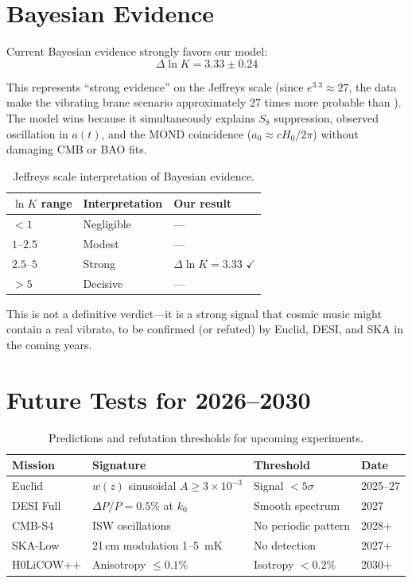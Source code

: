 \section{Bayesian Evidence}
\label{sec:bayesian}

Current Bayesian evidence strongly favors our model:
\begin{equation}
\Delta\ln K = 3.33 \pm 0.24
\end{equation}

This represents ``strong evidence'' on the Jeffreys scale (since $e^{3.3} \approx 27$, the data make the vibrating brane scenario approximately 27 times more probable than \LCDM). The model wins because it simultaneously explains $S_8$ suppression, observed oscillation in $a(t)$, and the MOND coincidence ($a_0 \approx cH_0/2\pi$) without damaging CMB or BAO fits.

\begin{table}[h]
\centering
\caption{Jeffreys scale interpretation of Bayesian evidence.}
\begin{tabular}{@{}lll@{}}
\toprule
\textbf{$\ln K$ range} & \textbf{Interpretation} & \textbf{Our result} \\
\midrule
$< 1$ & Negligible & --- \\
$1$--$2.5$ & Modest & --- \\
$2.5$--$5$ & Strong & $\Delta\ln K = 3.33$ $\checkmark$ \\
$> 5$ & Decisive & --- \\
\bottomrule
\end{tabular}
\end{table}

This is not a definitive verdict---it is a strong signal that cosmic music might contain a real vibrato, to be confirmed (or refuted) by Euclid, DESI, and SKA in the coming years.

\section{Future Tests for 2026--2030}
\label{sec:future_tests}

\begin{table}[h]
\centering
\caption{Predictions and refutation thresholds for upcoming experiments.}
\begin{tabular}{@{}llll@{}}
\toprule
\textbf{Mission} & \textbf{Signature} & \textbf{Threshold} & \textbf{Date} \\
\midrule
Euclid & $w(z)$ sinusoidal $A \ge 3 \times 10^{-3}$ & Signal $< 5\sigma$ & 2025--27 \\
DESI Full & $\Delta P/P = 0.5\%$ at $k_0$ & Smooth spectrum & 2027 \\
CMB-S4 & ISW oscillations & No periodic pattern & 2028+ \\
SKA-Low & 21\,cm modulation 1--5~mK & No detection & 2027+ \\
H0LiCOW++ & Anisotropy $\le 0.1\%$ & Isotropy $< 0.2\%$ & 2030+ \\
\bottomrule
\end{tabular}
\end{table}
